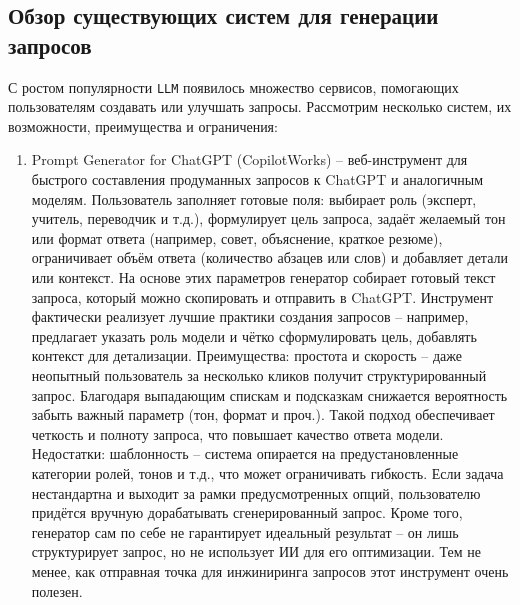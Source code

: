 \subsection{Обзор существующих систем для генерации запросов} С ростом популярности \texttt{LLM} появилось множество сервисов, помогающих пользователям создавать или улучшать запросы. Рассмотрим несколько систем, их возможности, преимущества и ограничения:
\begin{enumerate}[label=\arabic*]
\item Prompt Generator for ChatGPT (CopilotWorks) – веб-инструмент для быстрого составления продуманных запросов к ChatGPT и аналогичным моделям. Пользователь заполняет готовые поля: выбирает роль (эксперт, учитель, переводчик и т.д.), формулирует цель запроса, задаёт желаемый тон или формат ответа (например, совет, объяснение, краткое резюме), ограничивает объём ответа (количество абзацев или слов) и добавляет детали или контекст\cite{copilotworks:promptgen}.  На основе этих параметров генератор собирает готовый текст запроса, который можно скопировать и отправить в ChatGPT\cite{copilotworks:promptgen}. Инструмент фактически реализует лучшие практики создания запросов – например, предлагает указать роль модели и чётко сформулировать цель, добавлять контекст для детализации\cite{copilotworks:promptgen}. Преимущества: простота и скорость – даже неопытный пользователь за несколько кликов получит структурированный запрос. Благодаря выпадающим спискам и подсказкам снижается вероятность забыть важный параметр (тон, формат и проч.). Такой подход обеспечивает четкость и полноту запроса, что повышает качество ответа модели. Недостатки: шаблонность – система опирается на предустановленные категории ролей, тонов и т.д., что может ограничивать гибкость. Если задача нестандартна и выходит за рамки предусмотренных опций, пользователю придётся вручную дорабатывать сгенерированный запрос. Кроме того, генератор сам по себе не гарантирует идеальный результат – он лишь структурирует запрос, но не использует ИИ для его оптимизации. Тем не менее, как отправная точка для инжиниринга запросов этот инструмент очень полезен.


\end{enumerate}
